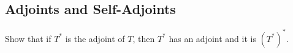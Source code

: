 \subsection{Adjoints and Self-Adjoints}
\item Show that if $T^{*}$ is the adjoint of $T$, then $T^{*}$ has an adjoint and it is $(T^{*})^{*}$.